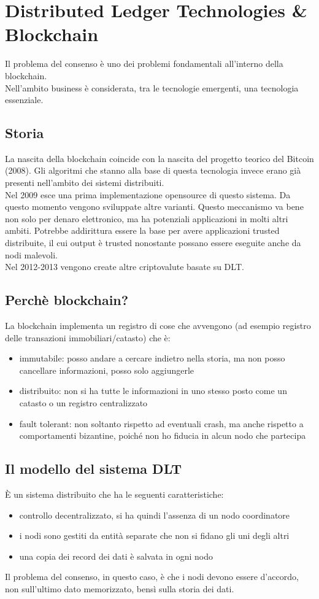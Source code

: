 \section{Distributed Ledger Technologies \& Blockchain}
Il problema del consenso è uno dei problemi fondamentali all'interno della blockchain.\\
Nell'ambito business è considerata, tra le tecnologie emergenti, una tecnologia essenziale.

\subsection{Storia}
La nascita della blockchain coincide con la nascita del progetto teorico del Bitcoin (2008). Gli algoritmi che stanno alla base di questa tecnologia invece erano già presenti nell'ambito dei sistemi distribuiti.\\
Nel 2009 esce una prima implementazione opensource di questo sistema. Da questo momento vengono sviluppate altre varianti. Questo meccanismo va bene non solo per denaro elettronico, ma ha potenziali applicazioni in molti altri ambiti. Potrebbe addirittura essere la base per avere applicazioni trusted distribuite, il cui output è trusted nonostante possano essere eseguite anche da nodi malevoli.
\\
Nel 2012-2013 vengono create altre criptovalute basate su DLT. 

\subsection{Perchè blockchain?}
La blockchain implementa un registro di cose che avvengono (ad esempio registro delle transazioni immobiliari/catasto) che è:
\begin{itemize}
    \item immutabile: posso andare a cercare indietro nella storia, ma non posso cancellare informazioni, posso solo aggiungerle
    \item distribuito: non si ha tutte le informazioni in uno stesso posto come un catasto o un registro centralizzato
    \item fault tolerant: non soltanto rispetto ad eventuali crash, ma anche rispetto a comportamenti bizantine, poiché non ho fiducia in alcun nodo che partecipa
\end{itemize}

\subsection{Il modello del sistema DLT}
È un sistema distribuito che ha le seguenti caratteristiche:
\begin{itemize}
    \item controllo decentralizzato, si ha quindi l'assenza di un nodo coordinatore
    \item i nodi sono gestiti da entità separate che non si fidano gli uni degli altri
    \item una copia dei record dei dati è salvata in ogni nodo
\end{itemize}
Il problema del consenso, in questo caso, è che i nodi devono essere d'accordo, non sull'ultimo dato memorizzato, bensì sulla storia dei dati. 

